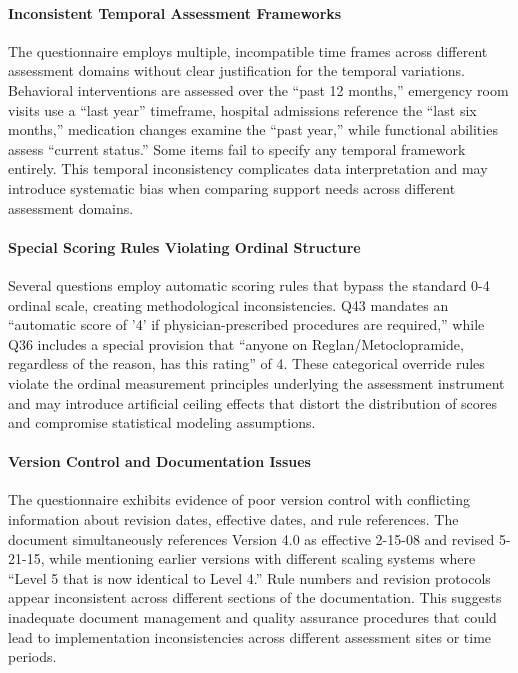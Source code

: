 \paragraph{Inconsistent Temporal Assessment Frameworks}
The questionnaire employs multiple, incompatible time frames across different assessment domains without clear justification for the temporal variations. Behavioral interventions are assessed over the ``past 12 months,'' emergency room visits use a ``last year'' timeframe, hospital admissions reference the ``last six months,'' medication changes examine the ``past year,'' while functional abilities assess ``current status.'' Some items fail to specify any temporal framework entirely. This temporal inconsistency complicates data interpretation and may introduce systematic bias when comparing support needs across different assessment domains.

\paragraph{Special Scoring Rules Violating Ordinal Structure}
Several questions employ automatic scoring rules that bypass the standard 0-4 ordinal scale, creating methodological inconsistencies. Q43 mandates an ``automatic score of '4' if physician-prescribed procedures are required,'' while Q36 includes a special provision that ``anyone on Reglan/Metoclopramide, regardless of the reason, has this rating'' of 4. These categorical override rules violate the ordinal measurement principles underlying the assessment instrument and may introduce artificial ceiling effects that distort the distribution of scores and compromise statistical modeling assumptions.

\paragraph{Version Control and Documentation Issues}
The questionnaire exhibits evidence of poor version control with conflicting information about revision dates, effective dates, and rule references. The document simultaneously references Version 4.0 as effective 2-15-08 and revised 5-21-15, while mentioning earlier versions with different scaling systems where ``Level 5 that is now identical to Level 4.'' Rule numbers and revision protocols appear inconsistent across different sections of the documentation. This suggests inadequate document management and quality assurance procedures that could lead to implementation inconsistencies across different assessment sites or time periods.


